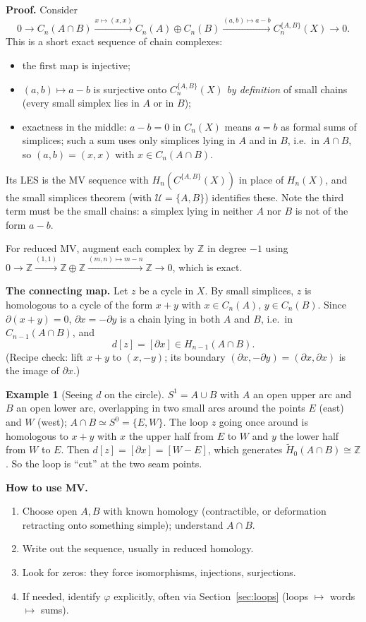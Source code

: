 \documentclass[11pt]{article}
\newcommand{\Z}{\mathbb Z}
\newcommand{\Hred}{\tilde H}
\theoremstyle{definition}
\newtheorem{ex}[thm]{Example}
\begin{document}
\textbf{Proof.} Consider
\[0\to C_n(A\cap B)\xrightarrow{x\mapsto(x,x)}C_n(A)\oplus C_n(B)\xrightarrow{(a,b)\mapsto a-b}C_n^{\{A,B\}}(X)\to0.\]
This is a short exact sequence of chain complexes:
\begin{itemize}
\item the first map is injective;
\item $(a,b)\mapsto a-b$ is surjective onto $C_n^{\{A,B\}}(X)$ \emph{by definition} of small chains (every small simplex lies in $A$ or in $B$);
\item exactness in the middle: $a-b=0$ in $C_n(X)$ means $a=b$ as formal sums of simplices; such a sum uses only simplices lying in $A$ and in $B$, i.e.\ in $A\cap B$, so $(a,b)=(x,x)$ with $x\in C_n(A\cap B)$.
\end{itemize}
Its LES is the MV sequence with $H_n(C^{\{A,B\}}(X))$ in place of $H_n(X)$, and the small simplices theorem (with $\mathcal U=\{A,B\}$) identifies these. Note the third term must be the small chains: a simplex lying in neither $A$ nor $B$ is not of the form $a-b$.

For reduced MV, augment each complex by $\Z$ in degree $-1$ using $0\to\Z\xrightarrow{(1,1)}\Z\oplus\Z\xrightarrow{(m,n)\mapsto m-n}\Z\to0$, which is exact.

\textbf{The connecting map.} Let $z$ be a cycle in $X$. By small simplices, $z$ is homologous to a cycle of the form $x+y$ with $x\in C_n(A)$, $y\in C_n(B)$. Since $\partial(x+y)=0$, $\partial x=-\partial y$ is a chain lying in both $A$ and $B$, i.e.\ in $C_{n-1}(A\cap B)$, and
\[d[z]=[\partial x]\in H_{n-1}(A\cap B).\]
(Recipe check: lift $x+y$ to $(x,-y)$; its boundary $(\partial x,-\partial y)=(\partial x,\partial x)$ is the image of $\partial x$.)

\begin{ex}[Seeing $d$ on the circle]
$S^1=A\cup B$ with $A$ an open upper arc and $B$ an open lower arc, overlapping in two small arcs around the points $E$ (east) and $W$ (west); $A\cap B\simeq S^0=\{E,W\}$. The loop $z$ going once around is homologous to $x+y$ with $x$ the upper half from $E$ to $W$ and $y$ the lower half from $W$ to $E$. Then $d[z]=[\partial x]=[W-E]$, which generates $\Hred_0(A\cap B)\cong\Z$. So the loop is ``cut'' at the two seam points.
\end{ex}

\textbf{How to use MV.}
\begin{enumerate}
\item Choose open $A,B$ with known homology (contractible, or deformation retracting onto something simple); understand $A\cap B$.
\item Write out the sequence, usually in reduced homology.
\item Look for zeros: they force isomorphisms, injections, surjections.
\item If needed, identify $\varphi$ explicitly, often via Section~\ref{sec:loops} (loops $\mapsto$ words $\mapsto$ sums).
\end{enumerate}
\end{document}
